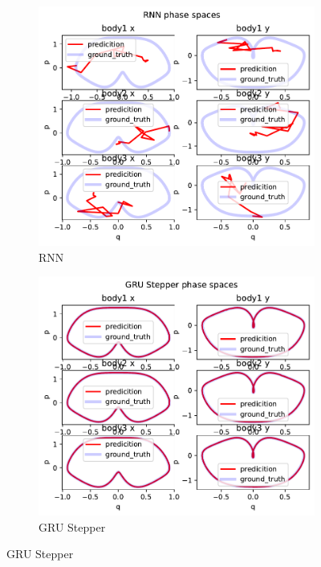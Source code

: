 \begin{figure}[H]
	\begin{subfigure}[b]{0.3\textwidth}
		\centering
		\includegraphics[width=\textwidth]{chapters/chapter5/body3_rnn_ps.pdf}
		\caption{RNN}
	\end{subfigure}
	\hfill
	\begin{subfigure}[b]{0.3\textwidth}
		\centering
		\includegraphics[width=\textwidth]{chapters/chapter5/body3_gre_ps.pdf}
		\caption{GRU Stepper}
	\end{subfigure}

\end{figure}
